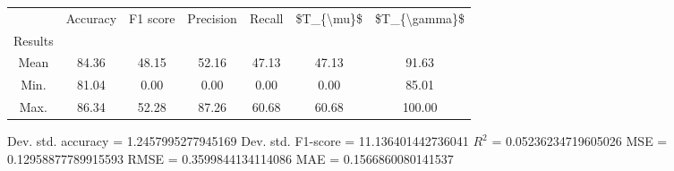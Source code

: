 \begin{tabular}{|c|c|c|c|c|c|c|}
\toprule
{} &  Accuracy &  F1 score &  Precision &  Recall &  \$T\_\{\textbackslash mu\}\$ &  \$T\_\{\textbackslash gamma\}\$ \\
Results &           &           &            &         &            &               \\
\hline
Mean    &     84.36 &     48.15 &      52.16 &   47.13 &      47.13 &         91.63 \\
Min.    &     81.04 &      0.00 &       0.00 &    0.00 &       0.00 &         85.01 \\
Max.    &     86.34 &     52.28 &      87.26 &   60.68 &      60.68 &        100.00 \\
\bottomrule
\end{tabular}

 Dev. std. accuracy = 1.2457995277945169
 Dev. std. F1-score = 11.136401442736041
 $R^2$ = 0.05236234719605026
 MSE = 0.12958877789915593
 RMSE = 0.3599844134114086
 MAE = 0.1566860080141537